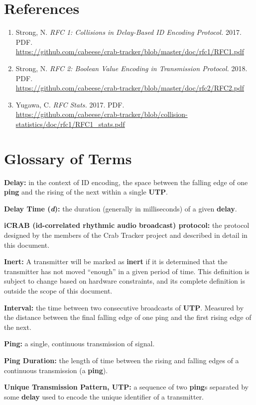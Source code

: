 \documentclass[12pt,hidelinks]{article}
\begin{document}

\newpage
\section{References} \label{references}

\begin{enumerate}
\item \label{ref-rfc1}
	Strong, N.
	{\em RFC 1: Collisions in Delay-Based ID Encoding Protocol.}
	2017. PDF.\\
	\url{https://github.com/cabeese/crab-tracker/blob/master/doc/rfc1/RFC1.pdf}
\item \label{ref-rfc2}
	Strong, N.
	{\em RFC 2: Boolean Value Encoding in Transmission Protocol.}
	2018. PDF.\\
	\url{https://github.com/cabeese/crab-tracker/blob/master/doc/rfc2/RFC2.pdf}
\item \label{ref-rfc-stats}
	Yugawa, C.
	{\em RFC Stats.}
	2017. PDF.\\
	\url{https://github.com/cabeese/crab-tracker/blob/collision-statistics/doc/rfc1/RFC1_stats.pdf}
\end{enumerate}


\appendix
\section{Glossary of Terms} \label{glossary}

{\bf Delay:}
	in the context of ID encoding, the space between the falling edge of one
	{\bf ping} and the rising of the next within a single {\bf UTP}.

{\bf Delay Time ({\em d}):}
	the duration (generally in milliseconds) of a given {\bf delay}.

{\bf iCRAB (id-correlated rhythmic audio broadcast) protocol:}
	the protocol designed by the members of the Crab Tracker project and
	described in detail in this document.

{\bf Inert:}
	A transmitter will be marked as {\bf inert} if it is determined that the
	transmitter has not moved ``enough'' in a given period of time.
	This definition is subject to change based on hardware constraints,
	and its complete definition is outside the scope of this document.

{\bf Interval:}
	the time between two consecutive broadcasts of {\bf UTP}. Measured by the
	distance between the final falling edge of one ping and the first rising
	edge of the next.

{\bf Ping:}
	a single, continuous transmission of signal.

{\bf Ping Duration:}
	the length of time between the rising and falling edges of a continuous
	transmission (a {\bf ping}).

{\bf Unique Transmission Pattern, UTP:}
	a sequence of two {\bf ping}s separated by some {\bf delay} used to
	encode the unique identifier of a transmitter.
\end{document}
